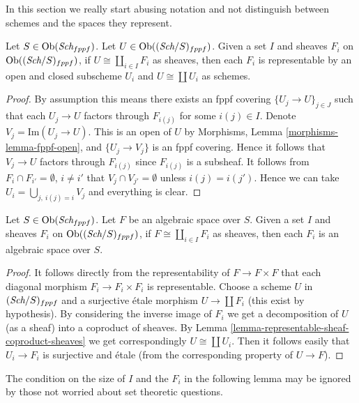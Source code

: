 \noindent
In this section we really start abusing notation and not
distinguish between schemes and the spaces they represent.

\begin{lemma}
\label{lemma-representable-sheaf-coproduct-sheaves}
Let $S \in \mathop{\rm Ob}\nolimits(\textit{Sch}_{fppf})$.
Let $U \in \mathop{\rm Ob}\nolimits((\textit{Sch}/S)_{fppf})$.
Given a set $I$ and sheaves $F_i$ on $\mathop{\rm Ob}\nolimits((\textit{Sch}/S)_{fppf})$,
if $U \cong \coprod_{i\in I} F_i$
as sheaves, then each $F_i$ is representable by an open and closed
subscheme $U_i$ and $U \cong \coprod U_i$ as schemes.
\end{lemma}

\begin{proof}
By assumption this means there exists an fppf covering
$\{U_j \to U\}_{j \in J}$ such that each $U_j \to U$
factors through $F_{i(j)}$ for some $i(j) \in I$.
Denote $V_j = \text{Im}(U_j \to U)$.
This is an open of $U$ by
Morphisms, Lemma \ref{morphisms-lemma-fppf-open}, and
$\{U_j \to V_j\}$ is an fppf covering. Hence it follows that
$V_j \to U$ factors through $F_{i(j)}$ since $F_{i(j)}$ is
a subsheaf. It follows from $F_i \cap F_{i'} = \emptyset$, $i \not = i'$
that $V_j \cap V_{j'} = \emptyset$
unless $i(j) = i(j')$. Hence we can take
$U_i = \bigcup_{j, \ i(j) = i} V_j$ and everything is clear.
\end{proof}

\begin{lemma}
\label{lemma-algebraic-space-coproduct-sheaves}
Let $S \in \mathop{\rm Ob}\nolimits(\textit{Sch}_{fppf})$.
Let $F$ be an algebraic space over $S$.
Given a set $I$ and sheaves $F_i$ on
$\mathop{\rm Ob}\nolimits((\textit{Sch}/S)_{fppf})$,
if $F \cong \coprod_{i\in I} F_i$ as sheaves,
then each $F_i$ is an algebraic space over $S$.
\end{lemma}

\begin{proof}
It follows directly from the representability of
$F \to F \times F$ that each diagonal morphism
$F_i \to F_i \times F_i$ is representable.
Choose a scheme $U$ in $(\textit{Sch}/S)_{fppf}$ and a surjective
\'etale morphism $U \to \coprod F_i$ (this exist by hypothesis).
By considering the inverse image of $F_i$ we get a decomposition
of $U$ (as a sheaf) into a coproduct of sheaves.
By Lemma \ref{lemma-representable-sheaf-coproduct-sheaves}
we get correspondingly $U \cong \coprod U_i$.
Then it follows easily that $U_i \to F_i$ is surjective
and \'etale (from the corresponding property of $U \to F$).
\end{proof}

\noindent
The condition on the size of $I$ and the $F_i$ in the
following lemma may be ignored by those not worried about
set theoretic questions.

